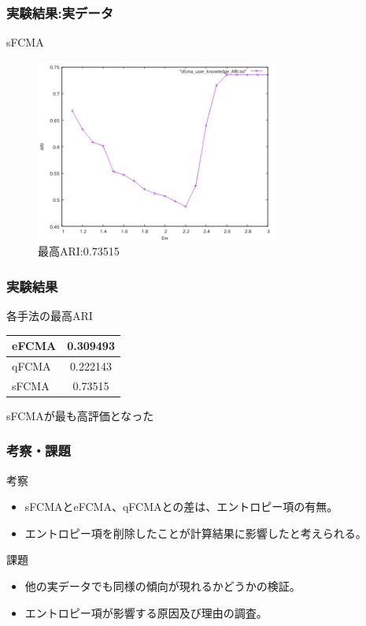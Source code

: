 \documentclass[13pt,dvipdfmx]{beamer}
\begin{document}
\begin{frame}\frametitle{実験結果:実データ}
  \begin{block}{sFCMA}
   \begin{figure}[htbp]
    \begin{center}
    \includegraphics[height=60mm]{sfcma_ARI.png}
   \end{center}
   \captionsetup{labelformat=empty,labelsep=none}
   \caption{最高ARI:0.73515}
  \end{figure}
 \end{block}
\end{frame}

\begin{frame}\frametitle{実験結果}
\begin{block}{各手法の最高ARI}
\vspace{5mm}
  \begin{table}[htb]
   \begin{tabular}{ l | c }\hline
     eFCMA & 0.309493 \\ \hline  
     qFCMA & 0.222143\\  \hline
     sFCMA & 0.73515\\ \hline
   \end{tabular}
  \end{table}
  sFCMAが最も高評価となった
 \end{block}
\end{frame}

\begin{frame}\frametitle{考察・課題}
  \begin{block}{考察}
    \begin{itemize}
    \item sFCMAとeFCMA、qFCMAとの差は、エントロピー項の有無。
    \item エントロピー項を削除したことが計算結果に影響したと考えられる。
    \end{itemize}
    \end{block}
  \begin{block}{課題}
    \begin{itemize}
    \item 他の実データでも同様の傾向が現れるかどうかの検証。
    \item エントロピー項が影響する原因及び理由の調査。
    \end{itemize}
    \end{block}
\end{frame}
\end{document}
